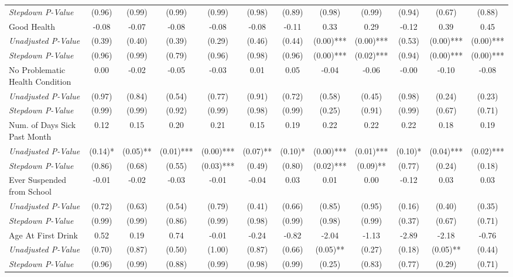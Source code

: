 \begin{tabular}{l c c c c c c c c c c c}
\quad \textit{Stepdown P-Value} & (0.96) & (0.99) & (0.99) & (0.99) & (0.98) & (0.89) & (0.98) & (0.99) & (0.94) & (0.67) & (0.88) \\
Good Health & -0.08 & -0.07 & -0.08 & -0.08 & -0.08 & -0.11 & 0.33 & 0.29 & -0.12 & 0.39 & 0.45 \\
\quad \textit{Unadjusted P-Value} & (0.39) & (0.40) & (0.39) & (0.29) & (0.46) & (0.44) & (0.00)*** & (0.00)*** & (0.53) & (0.00)*** & (0.00)*** \\
\quad \textit{Stepdown P-Value} & (0.96) & (0.99) & (0.79) & (0.96) & (0.98) & (0.96) & (0.00)*** & (0.02)*** & (0.94) & (0.00)*** & (0.00)*** \\
No Problematic Health Condition & 0.00 & -0.02 & -0.05 & -0.03 & 0.01 & 0.05 & -0.04 & -0.06 & -0.00 & -0.10 & -0.08 \\
\quad \textit{Unadjusted P-Value} & (0.97) & (0.84) & (0.54) & (0.77) & (0.91) & (0.72) & (0.58) & (0.45) & (0.98) & (0.24) & (0.23) \\
\quad \textit{Stepdown P-Value} & (0.99) & (0.99) & (0.92) & (0.99) & (0.98) & (0.99) & (0.25) & (0.91) & (0.99) & (0.67) & (0.71) \\
Num. of Days Sick Past Month & 0.12 & 0.15 & 0.20 & 0.21 & 0.15 & 0.19 & 0.22 & 0.22 & 0.22 & 0.18 & 0.19 \\
\quad \textit{Unadjusted P-Value} & (0.14)* & (0.05)** & (0.01)*** & (0.00)*** & (0.07)** & (0.10)* & (0.00)*** & (0.01)*** & (0.10)* & (0.04)*** & (0.02)*** \\
\quad \textit{Stepdown P-Value} & (0.86) & (0.68) & (0.55) & (0.03)*** & (0.49) & (0.80) & (0.02)*** & (0.09)** & (0.77) & (0.24) & (0.18) \\
Ever Suspended from School & -0.01 & -0.02 & -0.03 & -0.01 & -0.04 & 0.03 & 0.01 & 0.00 & -0.12 & 0.03 & 0.03 \\
\quad \textit{Unadjusted P-Value} & (0.72) & (0.63) & (0.54) & (0.79) & (0.41) & (0.66) & (0.85) & (0.95) & (0.16) & (0.40) & (0.35) \\
\quad \textit{Stepdown P-Value} & (0.99) & (0.99) & (0.86) & (0.99) & (0.98) & (0.99) & (0.98) & (0.99) & (0.37) & (0.67) & (0.71) \\
Age At First Drink & 0.52 & 0.19 & 0.74 & -0.01 & -0.24 & -0.82 & -2.04 & -1.13 & -2.89 & -2.18 & -0.76 \\
\quad \textit{Unadjusted P-Value} & (0.70) & (0.87) & (0.50) & (1.00) & (0.87) & (0.66) & (0.05)** & (0.27) & (0.18) & (0.05)** & (0.44) \\
\quad \textit{Stepdown P-Value} & (0.96) & (0.99) & (0.88) & (0.99) & (0.98) & (0.99) & (0.25) & (0.83) & (0.77) & (0.29) & (0.71) \\
\bottomrule
\end{tabular}

